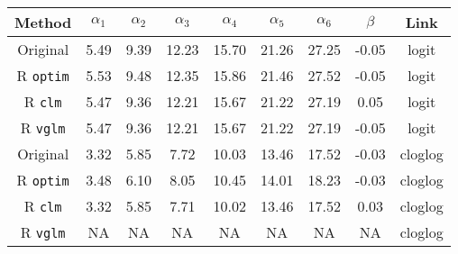 
\begin{tabular}{ccccccccc}
\toprule
Method & $\alpha_1$ & $\alpha_2$ & $\alpha_3$ & $\alpha_4$ & $\alpha_5$ & $\alpha_6$ & $\beta$ & Link\\
\midrule
Original \citep{candy1991modeling} & 5.49 & 9.39 & 12.23 & 15.70 & 21.26 & 27.25 & -0.05 & logit\\
R \verb+optim+ & 5.53 & 9.48 & 12.35 & 15.86 & 21.46 & 27.52 & -0.05 & logit\\
R \verb+clm+ & 5.47 & 9.36 & 12.21 & 15.67 & 21.22 & 27.19 & 0.05 & logit\\
R \verb+vglm+ & 5.47 & 9.36 & 12.21 & 15.67 & 21.22 & 27.19 & -0.05 & logit\\
\addlinespace
Original \citep{candy1991modeling} & 3.32 & 5.85 & 7.72 & 10.03 & 13.46 & 17.52 & -0.03 & cloglog\\
R \verb+optim+ & 3.48 & 6.10 & 8.05 & 10.45 & 14.01 & 18.23 & -0.03 & cloglog\\
R \verb+clm+ & 3.32 & 5.85 & 7.71 & 10.02 & 13.46 & 17.52 & 0.03 & cloglog\\
R \verb+vglm+ & NA & NA & NA & NA & NA & NA & NA & cloglog\\
\bottomrule
\end{tabular}